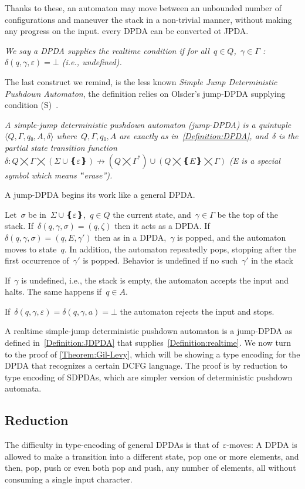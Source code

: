 Thanks to these, an automaton may move between an unbounded number of 
  configurations and maneuver the stack in a non-trivial manner, 
  without making any progress on the input.
every DPDA can be converted ot JPDA.
\begin{Definition}
  \label{Definition:realtime}
  \slshape
We say a DPDA supplies the \emph{realtime condition} if
  for all~$q∈Q$,~$γ∈Γ$ :~$δ(q,γ,ε)=⊥$ (i.e., undefined).
\end{Definition}

The last construct we remind, is the less known \emph{Simple Jump Deterministic Pushdown Automaton},
the definition relies on Olsder's jump-DPDA supplying condition (S)~\cite{Courcelle:77}.

\begin{Definition}
  \label{Definition:JDPDA}
  \slshape
  A \emph{simple-jump deterministic pushdown automaton} (jump-DPDA) is a quintuple~$⟨Q,Γ,q₀,A,δ⟩$
  where~$Q,Γ,q₀,A$ are exactly as in~\cref{Definition:DPDA},
  and~$δ$ is the
  \emph{partial state transition function}~$δ:Q⨉Γ⨉(Σ∪❴ε❵)↛(Q⨉Γ^*)∪(Q⨉❴E❵⨉Γ)$
  (E is a special symbol which means ‟erase”).
  \par
  A jump-DPDA begins its work like a general DPDA\@.
  \par
  Let~$σ$ be in~$Σ∪❴ε❵$,~$q∈Q$ the current state, and~$γ∈Γ$ be the top of the stack.
  If~$δ(q,γ,σ)=(q,ζ)$ then it acts as a DPDA\@.
  If~$δ(q,γ,σ)=(q,E,γ')$ then as in a DPDA,~$γ$ is popped, and the automaton
  moves to state~$q$. 
  In addition, the automaton repeatedly pops, stopping after the first occurrence of~$γ'$ is popped.
  Behavior is undefined if no such~$γ'$ in the stack 
  \par
  If~$γ$ is undefined, i.e., the stack is empty, the automaton accepts the input and halts.
  The same happens if~$q∈A$.
  \par
  If~$δ(q,γ,ε)=δ(q,γ,a)=⊥$ the automaton rejects the input and stops.
\end{Definition}

A realtime simple-jump deterministic pushdown automaton is a jump-DPDA
  as defined in~\cref{Definition:JDPDA}
  that supplies~\cref{Definition:realtime}.
We now turn to the proof of \cref{Theorem:Gil-Levy}, which will be showing a type encoding for the DPDA that recognizes a certain DCFG language.
The proof is by reduction to type encoding of SDPDAs, which are simpler version of deterministic pushdown automata.

\subsection{Reduction}
The difficulty in type-encoding of general DPDAs is that of~$ε$-moves:
A DPDA is allowed to make a transition into a different state,
  pop one or more elements, and then, pop, push or even both pop and push, any number of elements,
  all without consuming a single input character.

